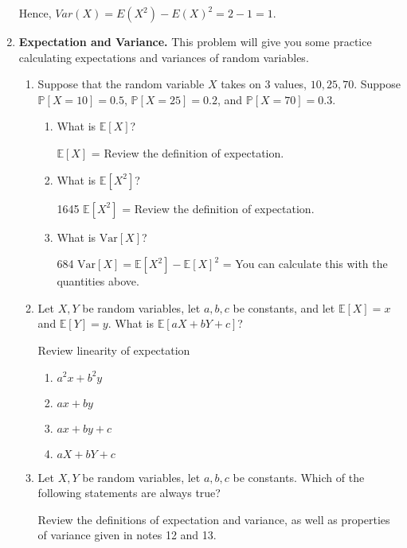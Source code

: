 \documentclass[11pt,preview]{standalone} %
\newcommand{\Prob}{\mathbb{P}}
\newcommand{\E}{\mathbb{E}}
\newcommand{\Var}{\text{Var}}
\begin{document}
\begin{enumerate}
\begin{Freeform}{1}
Hence, $Var(X) = E(X^2) - E(X)^2 = 2 - 1 = 1$.

\end{Freeform}


\item {\bf Expectation and Variance.} This problem will give you some practice calculating expectations and variances of random variables.
\begin{enumerate}
\item Suppose that the random variable $X$ takes on 3 values, $10, 25, 70$. Suppose $\Prob[X =10] = 0.5$, $\Prob[X = 25] = 0.2$, and $\Prob[X = 70] = 0.3$. 
\begin{enumerate}
\item What is $\E[X]$?
\begin{Freeform}{31}
$\E[X]$ = 
\Hint Review the definition of expectation.
\end{Freeform}
\item What is $\E[X^2]$?
\begin{Freeform}{1645}
$\E[X^2]$ = 
\Hint Review the definition of expectation.
\end{Freeform}
\item What is $\Var[X]$?
\begin{Freeform}{684}
$\Var[X] = \E[X^2] - \E[X]^2$ = 
\Hint You can calculate this with the quantities above.
\end{Freeform}
\end{enumerate}
\item Let $X, Y$ be random variables, let $a,b,c$ be constants, and let $\E[X] = x$ and $\E[Y] = y$. What is $\E[aX + bY + c]$?
\begin{Choices}
Review linearity of expectation
\begin{enumerate}
\FalseChoice\item $a^2x + b^2y$
\FalseChoice\item $ax + by$
\TrueChoice\item $ax + by + c$
\FalseChoice\item $aX + bY + c$
\end{enumerate}
\end{Choices}
\item Let $X, Y$ be random variables, let $a,b,c$ be constants. Which of the following statements are always true?
\begin{Multi}
Review the definitions of expectation and variance, as well as properties of variance given in notes 12 and 13.

\end{Multi}
\end{enumerate}
\end{enumerate}
\end{document}
